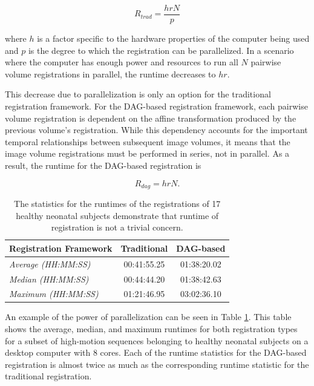 \begin{equation}
R_{trad} = \frac{hrN}{p}
\end{equation} 

\noindent where $h$ is a factor specific to the hardware properties of the computer being used and $p$ is the degree to which the registration can be parallelized. In a scenario where the computer has enough power and resources to run all $N$ pairwise volume registrations in parallel, the runtime decreases to $hr$. 

This decrease due to parallelization is only an option for the traditional registration framework. For the DAG-based registration framework, each pairwise volume registration is dependent on the affine transformation produced by the previous volume's registration. While this dependency accounts for the important temporal relationships between subsequent image volumes, it means that the image volume registrations must be performed in series, not in parallel. As a result, the runtime for the DAG-based registration is

\begin{equation}
R_{dag} = hrN.
\end{equation}

\begin{table}
\centering
\caption{The statistics for the runtimes of the registrations of 17 healthy neonatal subjects demonstrate that runtime of registration is not a trivial concern.}
\label{tab:runtime-example}
\begin{tabular}{|l|c|c|}
\hline
\textbf{Registration Framework} & \textbf{Traditional} & \textbf{DAG-based} \\ \hline
\textit{Average (HH:MM:SS)}     & 00:41:55.25          & 01:38:20.02        \\ \hline
\textit{Median (HH:MM:SS)}      & 00:44:44.20          & 01:38:42.63        \\ \hline
\textit{Maximum (HH:MM:SS)}     & 01:21:46.95          & 03:02:36.10        \\ \hline
\end{tabular}
\vspace{0.05\textwidth}
\end{table}

An example of the power of parallelization can be seen in Table \ref{tab:runtime-example}. This table shows the average, median, and maximum runtimes for both registration types for a subset of high-motion sequences belonging to healthy neonatal subjects on a desktop computer with 8 cores. Each of the runtime statistics for the DAG-based registration is almost twice as much as the corresponding runtime statistic for the traditional registration.

